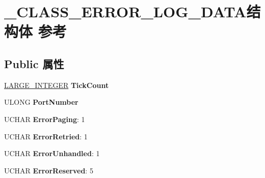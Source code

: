 \hypertarget{struct___c_l_a_s_s___e_r_r_o_r___l_o_g___d_a_t_a}{}\section{\+\_\+\+C\+L\+A\+S\+S\+\_\+\+E\+R\+R\+O\+R\+\_\+\+L\+O\+G\+\_\+\+D\+A\+T\+A结构体 参考}
\label{struct___c_l_a_s_s___e_r_r_o_r___l_o_g___d_a_t_a}
\subsection*{Public 属性}
\begin{DoxyCompactItemize}
\item 
\mbox{\label{struct___c_l_a_s_s___e_r_r_o_r___l_o_g___d_a_t_a_a60050425a1ddc03919fdefa76465d3ed}} 
\hyperlink{union___l_a_r_g_e___i_n_t_e_g_e_r}{L\+A\+R\+G\+E\+\_\+\+I\+N\+T\+E\+G\+ER} {\bfseries Tick\+Count}
\item 
\mbox{\label{struct___c_l_a_s_s___e_r_r_o_r___l_o_g___d_a_t_a_adcb0d97feddb421ba8982036445e4626}} 
U\+L\+O\+NG {\bfseries Port\+Number}
\item 
\mbox{\label{struct___c_l_a_s_s___e_r_r_o_r___l_o_g___d_a_t_a_a3b9fead39a4c55fdd073b590f6a78688}} 
U\+C\+H\+AR {\bfseries Error\+Paging}\+: 1
\item 
\mbox{\label{struct___c_l_a_s_s___e_r_r_o_r___l_o_g___d_a_t_a_ae6710df23195527f7b1d1b8260bc632d}} 
U\+C\+H\+AR {\bfseries Error\+Retried}\+: 1
\item 
\mbox{\label{struct___c_l_a_s_s___e_r_r_o_r___l_o_g___d_a_t_a_a29b3d72232b6da468da99fc87619e085}} 
U\+C\+H\+AR {\bfseries Error\+Unhandled}\+: 1
\item 
\mbox{\label{struct___c_l_a_s_s___e_r_r_o_r___l_o_g___d_a_t_a_af4aef4f8f6c9dfa8f8993a128ae1c92c}} 
U\+C\+H\+AR {\bfseries Error\+Reserved}\+: 5
\item 

\end{DoxyCompactItemize}
